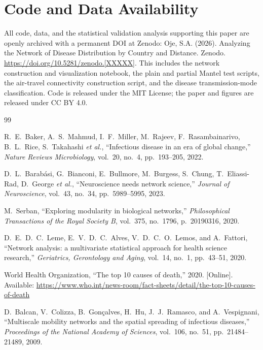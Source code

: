 \documentclass[11pt]{article}
\begin{document}
\section*{Code and Data Availability}

All code, data, and the statistical validation analysis supporting this paper are openly
archived with a permanent DOI at Zenodo: Oje, S.A. (2026). Analyzing the Network of Disease
Distribution by Country and Distance. Zenodo. \url{https://doi.org/10.5281/zenodo.[XXXXX]}. This
includes the network construction and visualization notebook, the plain and partial Mantel
test scripts, the air-travel connectivity construction script, and the disease
transmission-mode classification. Code is released under the MIT License; the paper and
figures are released under CC BY 4.0.

\begin{thebibliography}{99}

 R.~E.~Baker, A.~S.~Mahmud, I.~F.~Miller, M.~Rajeev, F.~Rasambainarivo,
B.~L.~Rice, S.~Takahashi \emph{et al.}, ``Infectious disease in an era of global change,''
\emph{Nature Reviews Microbiology}, vol.~20, no.~4, pp.~193--205, 2022.

 D.~L.~Barab\'{a}si, G.~Bianconi, E.~Bullmore, M.~Burgess, S.~Chung,
T.~Eliassi-Rad, D.~George \emph{et al.}, ``Neuroscience needs network science,'' \emph{Journal
of Neuroscience}, vol.~43, no.~34, pp.~5989--5995, 2023.

 M.~Serban, ``Exploring modularity in biological networks,''
\emph{Philosophical Transactions of the Royal Society B}, vol.~375, no.~1796, p.~20190316,
2020.

 D.~E.~D.~C.~Leme, E.~V.~D.~C.~Alves, V.~D.~C.~O.~Lemos, and A.~Fattori,
``Network analysis: a multivariate statistical approach for health science research,''
\emph{Geriatrics, Gerontology and Aging}, vol.~14, no.~1, pp.~43--51, 2020.

 World Health Organization, ``The top 10 causes of death,'' 2020.
[Online]. Available: \url{https://www.who.int/news-room/fact-sheets/detail/the-top-10-causes-of-death}

 D.~Balcan, V.~Colizza, B.~Gon\c{c}alves, H.~Hu, J.~J.~Ramasco, and
A.~Vespignani, ``Multiscale mobility networks and the spatial spreading of infectious
diseases,'' \emph{Proceedings of the National Academy of Sciences}, vol.~106, no.~51,
pp.~21484--21489, 2009.


\end{thebibliography}
\end{document}
